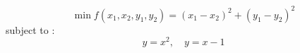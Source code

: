 $$\min f(x_1, x_2, y_1, y_2) = (x_1- x_2)^2 + (y_1 - y_2)^2$$
subject to : $$y = x^2, \quad y = x-1$$